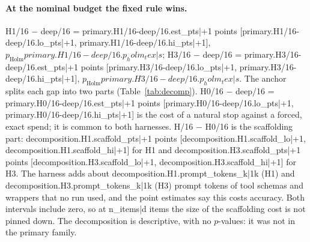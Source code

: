 \documentclass[11pt]{article}
\begin{document}
{{{{{{{{\paragraph{At the nominal budget the fixed rule wins.} H1/16 $-$ deep/16 = {{primary.H1/16-deep/16.est_pts|+1}}
points [{{primary.H1/16-deep/16.lo_pts|+1}}, {{primary.H1/16-deep/16.hi_pts|+1}}], $p_{\text{Holm}}
{{primary.H1/16-deep/16.p_holm_tex|s}}$; H3/16 $-$ deep/16 = {{primary.H3/16-deep/16.est_pts|+1}} points
[{{primary.H3/16-deep/16.lo_pts|+1}}, {{primary.H3/16-deep/16.hi_pts|+1}}], $p_{\text{Holm}}
{{primary.H3/16-deep/16.p_holm_tex|s}}$. The anchor splits each gap into two parts (Table~\ref{tab:decomp}).
H0/16 $-$ deep/16 = {{primary.H0/16-deep/16.est_pts|+1}} points [{{primary.H0/16-deep/16.lo_pts|+1}},
{{primary.H0/16-deep/16.hi_pts|+1}}] is the cost of a natural stop against a forced, exact spend; it is common to
both harnesses. H/16 $-$ H0/16 is the scaffolding part: {{decomposition.H1.scaffold_pts|+1}} points
[{{decomposition.H1.scaffold_lo|+1}}, {{decomposition.H1.scaffold_hi|+1}}] for H1 and
{{decomposition.H3.scaffold_pts|+1}} points [{{decomposition.H3.scaffold_lo|+1}},
{{decomposition.H3.scaffold_hi|+1}}] for H3. The harness adds about {{decomposition.H1.prompt_tokens_k|1}}k (H1)
and {{decomposition.H3.prompt_tokens_k|1}}k (H3) prompt tokens of tool schemas and wrappers that no run used, and
the point estimates say this costs accuracy. Both intervals include zero, so at {{n_items|d}} items the size of
the scaffolding cost is not pinned down. The decomposition is descriptive, with no $p$-values: it was not in the
primary family.

}}}}}}}}
\end{document}
